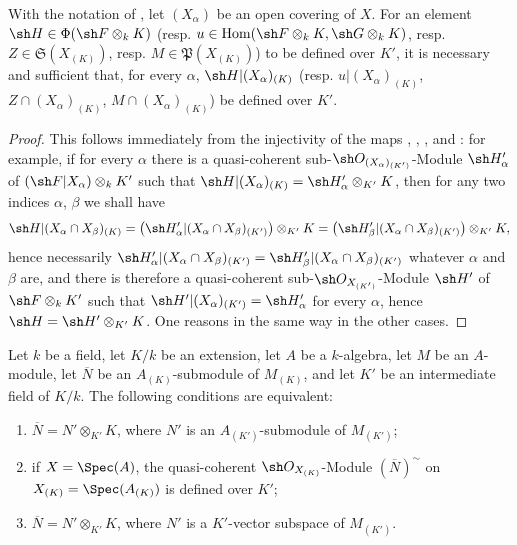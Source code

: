 \begin{proposition}[4.8.5]
\label{IV.4.8.5}
With the notation of , let $(X_\alpha)$ be an open
covering of $X$.
For an element $\sh H\in\Phi(\sh F\otimes_kK)$ \textup{(resp.}
$u\in\operatorname{Hom}(\sh F\otimes_kK,\sh G\otimes_kK)$, \textup{resp.}
$Z\in\mathfrak S(X_{(K)})$, \textup{resp.} $M\in\mathfrak P(X_{(K)})$\textup{)}
to be defined over $K'$, it is necessary and sufficient that, for every
$\alpha$, $\sh H|(X_\alpha)_{(K)}$ \textup{(resp.} $u|(X_\alpha)_{(K)}$,
$Z\cap(X_\alpha)_{(K)}$, $M\cap(X_\alpha)_{(K)}$\textup{)} be defined over $K'$.
\end{proposition}

\begin{proof}
This follows immediately from the injectivity of the maps
, , , and
: for example, if for every $\alpha$ there is a
quasi-coherent sub-$\sh O_{(X_\alpha)_{(K')}}$-Module
$\sh H'_\alpha$ of $(\sh F|X_\alpha)\otimes_kK'$ such that
$\sh H|(X_\alpha)_{(K)}=\sh H'_\alpha\otimes_{K'}K$, then for any two
indices $\alpha$, $\beta$ we shall have
\[
\sh H|(X_\alpha\cap X_\beta)_{(K)}
=\bigl(\sh H'_\alpha|(X_\alpha\cap X_\beta)_{(K')}\bigr)\otimes_{K'}K
=\bigl(\sh H'_\beta|(X_\alpha\cap X_\beta)_{(K')}\bigr)\otimes_{K'}K,
\]
hence necessarily
$\sh H'_\alpha|(X_\alpha\cap X_\beta)_{(K')}=\sh H'_\beta|(X_\alpha\cap X_\beta)_{(K')}$
whatever $\alpha$ and $\beta$ are, and there is therefore a quasi-coherent
sub-$\sh O_{X_{(K')}}$-Module $\sh H'$ of $\sh F\otimes_kK'$ such that
$\sh H'|(X_\alpha)_{(K')}=\sh H'_\alpha$ for every $\alpha$, hence
$\sh H=\sh H'\otimes_{K'}K$.
One reasons in the same way in the other cases.
\end{proof}

\begin{lemma}[4.8.6]
\label{IV.4.8.6}
Let $k$ be a field, let $K/k$ be an extension, let $A$ be a
$k$-algebra, let $M$ be an $A$-module, let $\overline N$ be an
$A_{(K)}$-submodule of $M_{(K)}$, and let $K'$ be an intermediate
field of $K/k$.
The following conditions are equivalent:
\begin{enumerate}
\item[\rm(a)]
\label{IV.4.8.6.a}
$\overline N=N'\otimes_{K'}K$, where $N'$ is an
$A_{(K')}$-submodule of $M_{(K')}$;

\item[\rm(b)]
\label{IV.4.8.6.b}
if $X=\Spec(A)$, the quasi-coherent
$\sh O_{X_{(K)}}$-Module $(\overline N)^{\sim}$ on
$X_{(K)}=\Spec(A_{(K)})$ is defined over $K'$;

\item[\rm(c)]
\label{IV.4.8.6.c}
$\overline N=N'\otimes_{K'}K$, where $N'$ is a $K'$-vector
subspace of $M_{(K')}$.
\end{enumerate}
\end{lemma}

